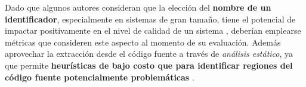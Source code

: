 Dado que algunos autores consideran que la elección del \textbf{nombre de un identificador},
especialmente en sistemas de gran tamaño, tiene el potencial de impactar positivamente en el 
nivel de calidad de un sistema \cite{Relf04}, deberían emplearse métricas que consideren este aspecto
al momento de su evaluación.
Además aprovechar la extracción desde el código fuente a través de \textit{análisis estático},
ya que permite \textbf{heurísticas de bajo costo que para identificar regiones del código fuente 
potencialmente problemáticas} \cite{ButlerWemelingerYu10}.
